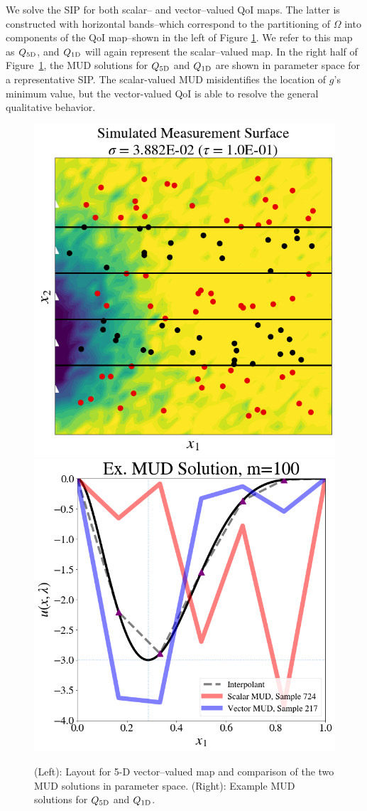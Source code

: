 We solve the SIP for both scalar-- and vector--valued QoI maps.
The latter is constructed with horizontal bands\---which correspond to the partitioning of $\Omega$ into components of the QoI map\---shown in the left of Figure \ref{fig:pde-highd-5d-example}.
We refer to this map as $Q_\text{5D}$, and $Q_\text{1D}$ will again represent the scalar--valued map.
In the right half of Figure~\ref{fig:pde-highd-5d-example}, the MUD solutions for $Q_\text{5D}$ and $Q_\text{1D}$ are shown in parameter space for a representative SIP.
The scalar-valued MUD misidentifies the location of $g$'s minimum value, but the vector-valued QoI is able to resolve the general qualitative behavior.

\begin{figure}
\centering
  \includegraphics[width=0.45\linewidth]{figures/pde-highd/pde-highd_sensors_D5}
  \includegraphics[width=0.45\linewidth]{figures/pde-highd/pde-highd_comp_exmud_D5_m100}
\caption{
(Left): Layout for 5-D vector--valued map and comparison of the two MUD solutions in parameter space.
(Right): Example MUD solutions for $Q_\text{5D}$ and $Q_\text{1D}$.
}
\label{fig:pde-highd-5d-example}
\end{figure}

